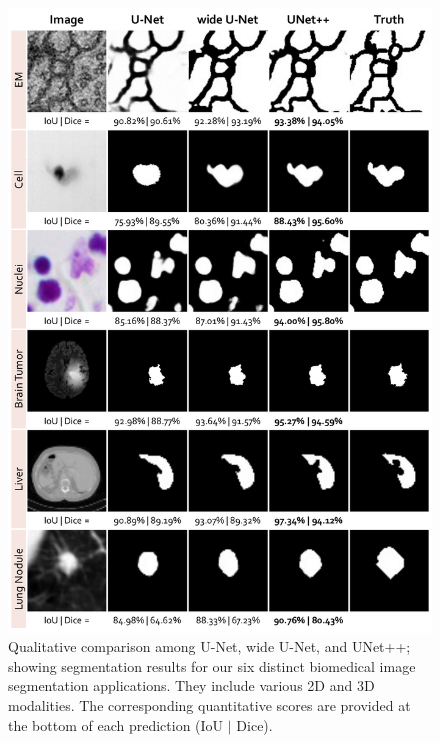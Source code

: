 \begin{figure}[t]
\begin{center}
\includegraphics[width=0.6\linewidth]{Figures/CH4/fig_qualitative_comparison.pdf}
\end{center}
\caption[Qualitative Comparison among U-Net, Wide U-Net, and UNet++]{
Qualitative comparison among U-Net, wide U-Net, and UNet++; showing segmentation results for our six distinct biomedical image segmentation applications. They include various 2D and 3D modalities. The corresponding quantitative scores are provided at the bottom of each prediction (IoU $|$ Dice).}
\label{ch4:fig:predict_visualization}
\end{figure}


